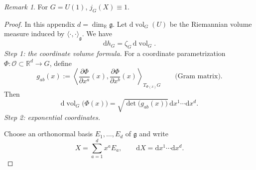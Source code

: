 \documentclass[10pt,reqno]{amsart}
\theoremstyle{definition}
\theoremstyle{remark}
\newtheorem{remark}[definition]{Remark}
\numberwithin{equation}{section}
\numberwithin{figure}{section}
\newcommand{\g}{\mathfrak g}
\newcommand{\dd}{\mathrm d}
\newcommand{\R}{\mathbb R}
\begin{document}
\begin{remark} For $G=U(1)$, $j_G(X)\equiv1$.\end{remark}

\begin{proof} In this appendix $d=\dim_\R\g$. Let $\dd\operatorname{vol}_G(U)$ be the Riemannian volume measure induced by
$\langle\cdot,\cdot\rangle_\g$. We have
\begin{equation}\label{eq:display-105}
\dd h_G=\zeta_G\,\dd\operatorname{vol}_G.
\end{equation}
\smallskip\noindent\emph{Step 1: the coordinate volume formula.}
For a coordinate parametrization $\Phi:\mathcal O\subset\R^d\to G$, define
\begin{equation}\label{eq:display-106}
g_{ab}(x):=
\left\langle\frac{\partial\Phi}{\partial x^a}(x),
\frac{\partial\Phi}{\partial x^b}(x)\right\rangle_{T_{\Phi(x)}G}
\qquad\text{(Gram matrix)}.
\end{equation}
Then
\begin{equation}\label{eq:display-107}
\dd\operatorname{vol}_G\bigl(\Phi(x)\bigr)
=\sqrt{\det\bigl(g_{ab}(x)\bigr)}\,\dd x^1\cdots\dd x^d.
\end{equation}
\smallskip\noindent\emph{Step 2: exponential coordinates.}

Choose an orthonormal basis $E_1,\ldots,E_d$ of $\g$ and write
\begin{equation}\label{eq:display-108}
X=\sum_{a=1}^d x^aE_a,
\qquad \dd X=\dd x^1\cdots\dd x^d.
\end{equation}


\end{proof}
\end{document}
